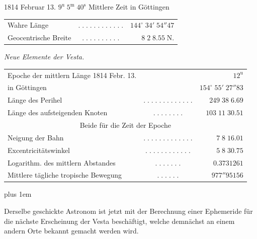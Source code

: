 \begin{center}1814 Februar 13. $9^{\mathrm u}\;5^{\mathrm m}\;40^{\mathrm s}$ Mittlere Zeit in Göttingen\end{center}
\begin{center}\fontsize{10}{12}\selectfont\setlength{\tabcolsep}{2pt}\renewcommand{\arraystretch}{1.15}\begin{tabular}{lcr}
Wahre Länge & $.\;.\;.\;.\;.\;.\;.\;.\;.\;.\;.\;.$ & $144^\circ\;34'\;54''47$\\
Geocentrische Breite & $.\;.\;.\;.\;.\;.\;.\;.\;.\;.$ & $8\;2\;8.55\;\mathrm{N.}$\\
\end{tabular}\end{center}

\emph{Neue Elemente der Vesta.}

\begin{center}\fontsize{9}{11}\selectfont\setlength{\tabcolsep}{2pt}\renewcommand{\arraystretch}{1.15}\begin{tabular}{lcr}
Epoche der mittlern Länge 1814 Febr. 13. & & $12^{\mathrm u}$\\
in Göttingen & & $154^\circ\;55'\;27''83$\\
Länge des Perihel & $.\;.\;.\;.\;.\;.\;.\;.\;.\;.\;.\;.\;.$ & $249\;38\;6.69$\\
Länge des aufsteigenden Knoten & $.\;.\;.\;.\;.\;.\;.\;.$ & $103\;11\;30.51$\\
\multicolumn{3}{c}{Beide für die Zeit der Epoche}\\
Neigung der Bahn & $.\;.\;.\;.\;.\;.\;.\;.\;.\;.\;.\;.\;.$ & $7\;8\;16.01$\\
Excentricitätswinkel & $.\;.\;.\;.\;.\;.\;.\;.\;.\;.\;.\;.$ & $5\;8\;30.75$\\
Logarithm. des mittlern Abstandes & $.\;.\;.\;.\;.\;.\;.$ & $0.3731261$\\
Mittlere tägliche tropische Bewegung & $.\;.\;.\;.\;.\;.$ & $977''95156$\\
\end{tabular}\end{center}

{\rightskip=0pt plus 1em \par\indent Derselbe geschickte Astronom ist jetzt mit der Berechnung einer Ephemeride für die nächste
Erscheinung der Vesta beschäftigt, welche demnächst an einem andern Orte bekannt gemacht
werden wird.\par}
